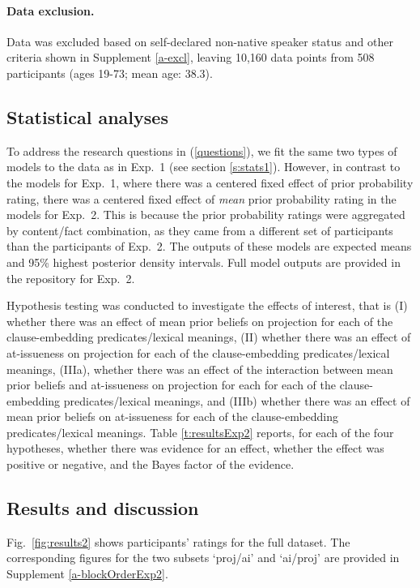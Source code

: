 \documentclass[11pt,fleqn]{article}
\newcommand{\6}{\mbox{$[\hspace*{-.6mm}[$}}
\newcommand{\9}{\mbox{$]\hspace*{-.6mm}]$}}
\begin{document}
\paragraph{Data exclusion.} Data was excluded based on self-declared non-native speaker status and other criteria shown in Supplement \ref{a-excl}, leaving 10,160 data points from 508 participants (ages 19-73; mean age: 38.3).

\subsection{Statistical analyses}

To address the research questions in (\ref{questions}), we fit the same two types of models to the data as in Exp.~1 (see section \ref{s:stats1}). However, in contrast to the models for Exp.~1, where there was a centered fixed effect of prior probability rating, there was a centered fixed effect of {\em mean} prior probability rating in the models for Exp.~2. This is because the prior probability ratings were aggregated by content/fact combination, as they came from a different set of participants than the participants of Exp.~2. The outputs of these models are expected means and 95\% highest posterior density intervals. Full model outputs are provided in the repository for Exp.~2.

Hypothesis testing was conducted to investigate the effects of interest, that is (I) whether there was an effect of mean prior beliefs on projection for each of the clause-embedding predicates/lexical meanings, (II) whether there was an effect of at-issueness on projection for each of the clause-embedding predicates/lexical meanings, (IIIa), whether there was an effect of the interaction between mean prior beliefs and at-issueness on projection for each  for each of the clause-embedding predicates/lexical meanings, and (IIIb) whether there was an effect of mean prior beliefs on at-issueness for each of the clause-embedding predicates/lexical meanings. Table \ref{t:resultsExp2} reports, for each of the four hypotheses, whether there was evidence for an effect, whether the effect was positive or negative, and the Bayes factor of the evidence. 

\subsection{Results and discussion}

Fig.~\ref{fig:results2} shows participants' ratings for the full dataset. The corresponding figures for the two subsets `proj/ai' and `ai/proj' are provided in Supplement \ref{a-blockOrderExp2}.
\end{document}
